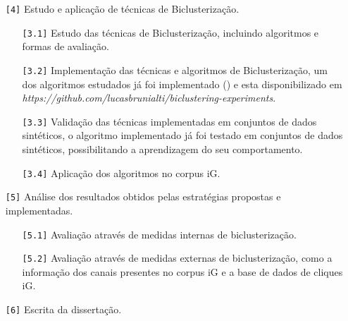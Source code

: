 \documentclass[normaltoc, espacoumemeio, pnumromarab,ruledheader]{abnt}
\begin{document}
\begin{enumerate}
\begin{enumerate}
  \end{enumerate}
  \item[{\texttt{[4]}}] Estudo e aplicação de técnicas de Biclusterização.
  \begin{enumerate}
    \item[{\texttt{[3.1]}}] Estudo das técnicas de Biclusterização, incluindo algoritmos e formas de avaliação.
    \item[{\texttt{[3.2]}}] Implementação das técnicas e algoritmos de Biclusterização, um dos algoritmos estudados já foi implementado (\cite{Cheng2000}) e esta disponibilizado em \textit{https://github.com/lucasbrunialti/biclustering-experiments}.
    \item[{\texttt{[3.3]}}] Validação das técnicas implementadas em conjuntos de dados sintéticos, o algoritmo implementado já foi testado em conjuntos de dados sintéticos, possibilitando a aprendizagem do seu comportamento.
    \item[{\texttt{[3.4]}}] Aplicação dos algoritmos no corpus iG.
  \end{enumerate}
  \item[{\texttt{[5]}}] Análise dos resultados obtidos pelas estratégias propostas e implementadas.
  \begin{enumerate}
    \item[{\texttt{[5.1]}}] Avaliação através de medidas internas de biclusterização.
    \item[{\texttt{[5.2]}}] Avaliação através de medidas externas de biclusterização, como a informação dos canais presentes no corpus iG e a base de dados de cliques iG.
  \end{enumerate}
  \item[{\texttt{[6]}}] Escrita da dissertação.
\end{enumerate}
\end{document}
